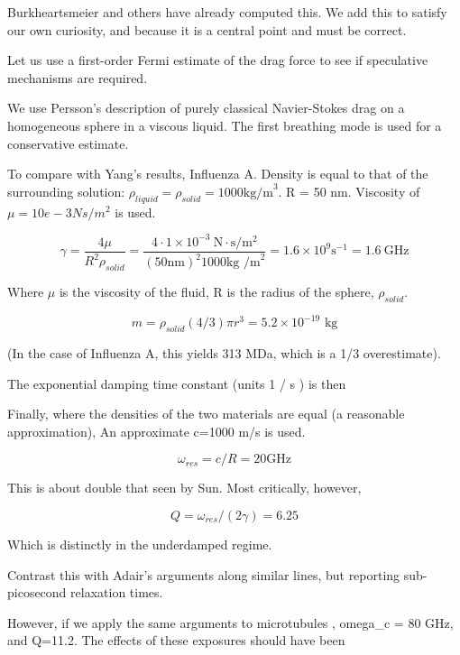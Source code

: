 \documentclass[paper.tex]{subfiles}
\begin{document}
\begin{autem}
	Burkheartsmeier and others have already computed this. We add this to satisfy our own curiosity, and because it is a central point and must be correct.
\end{autem}


Let us use a first-order Fermi estimate of the drag force to see if speculative mechanisms are required.

We use Persson's description of purely classical Navier-Stokes drag \cite{nature1986} on a homogeneous sphere in a viscous liquid. The first breathing mode is used for a conservative estimate.

To compare with Yang's results, Influenza A. Density is equal to that of the surrounding solution: $\rho_{liquid} = \rho_{solid} = 1000 \text{kg/m}^3$. R = 50 nm. Viscosity of $\mu=10e-3 Ns/m^2$ is used.

$$ \gamma = \frac{4\mu}{R^2 \rho_{solid}} = \frac{4 \cdot 1\times 10^{-3}\  \text{N}\cdot \text{s} / \text{m}^2 }{(50 \text{nm})^2 1000 \text{kg /m}^2} = 1.6 \times 10^9 \text{s}^{-1} = 1.6\ \text{GHz}$$

Where $\mu$ is the viscosity of the fluid, R is the radius of the sphere, $\rho_{solid}$. \footnotemark \footnotemark



$$m = \rho_{solid}  (4/3) \pi r^3 = 5.2 \times 10^{-19} \text{ kg} $$

(In the case of Influenza A, this yields 313 MDa, which is a 1/3 overestimate). 

The exponential damping time constant (units 1 / s ) is then

Finally, where the densities of the two materials are equal (a reasonable approximation), An approximate c=1000 m/s is used. 

$$ \omega_{res} = c / R = 20 \text{GHz}$$

This is about double that seen by Sun. Most critically, however,

$$ Q = \omega_{res}/(2\gamma) = 6.25 $$

Which is distinctly in the underdamped regime.

Contrast this with Adair's arguments along similar lines, but reporting sub-picosecond relaxation times.

However, if we apply the same arguments to microtubules \cite{Viscous2000}, omega_c = 80 GHz, and Q=11.2. The effects of these exposures should have been 
\end{document}

